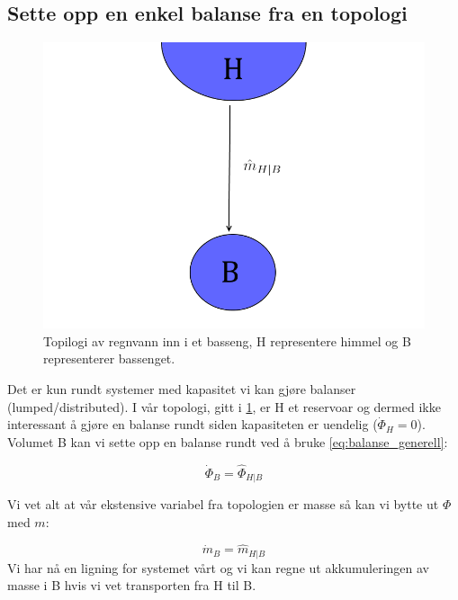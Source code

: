 \subsection{Sette opp en enkel balanse fra en topologi} \label{sec:balanse_enkel}

\begin{figure}[H]
    \centering
    \includegraphics[scale=0.3]{Figures/Basseng1.png}
    \caption{Topilogi av regnvann inn i et basseng, H representere himmel og B representerer bassenget.}
    \label{fig:topologi_enkel2}
\end{figure}
Det er kun rundt systemer med kapasitet vi kan gjøre balanser (lumped/distributed). I vår topologi, gitt i \cref{fig:topologi_enkel2}, er H et reservoar og dermed ikke interessant å gjøre en balanse rundt siden kapasiteten er uendelig ($\dot{\Phi}_H=0$). Volumet B kan vi sette opp en balanse rundt ved å bruke \cref{eq:balanse_generell}:

\begin{equation}
    \dot{\Phi}_{B} = \hat{\Phi}_{H|B}
\end{equation}

Vi vet alt at vår ekstensive variabel fra topologien er masse så kan vi bytte ut $\Phi$ med $m$:


\begin{equation}
    \dot{m}_B = \hat{m}_{H|B}    
\end{equation}
Vi har nå en ligning for systemet vårt og vi kan regne ut akkumuleringen av masse i B hvis vi vet transporten fra H til B. 

